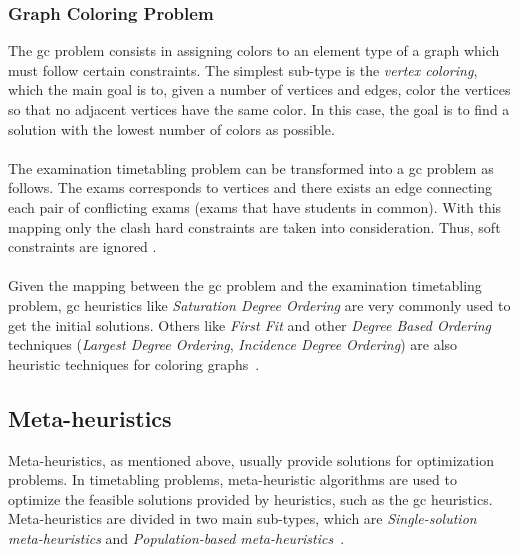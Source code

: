 \subsubsection{Graph Coloring Problem}
The \gls{gc} problem consists in assigning colors to an element type of a graph which must follow certain constraints. The simplest sub-type is the \textit{vertex coloring}, which the main goal is to, given a number of vertices and edges, color the vertices so that no adjacent vertices have the same color. In this case, the goal is to find a solution with the lowest number of colors as possible.\\
\\
The examination timetabling problem can be transformed into a \gls{gc} problem as follows. The exams corresponds to vertices and there exists an edge connecting each pair of conflicting exams (exams that have students in common). With this mapping only the clash hard constraints are taken into consideration. Thus, soft constraints are ignored \cite{Qu2009}.\\
\\
Given the mapping between the \gls{gc} problem and the examination timetabling problem, \gls{gc} heuristics like \textit{Saturation Degree Ordering} are very commonly used to get the initial solutions. Others like \textit{First Fit} and other \textit{Degree Based Ordering} techniques (\textit{Largest Degree Ordering}, \textit{Incidence Degree Ordering}) are also heuristic techniques for coloring graphs~\cite{Carter1996}.


\subsection{Meta-heuristics}
\label{subsec:MetaHeuristics}
Meta-heuristics, as mentioned above, usually provide solutions for optimization problems. In timetabling problems, meta-heuristic algorithms are used to optimize the feasible solutions provided by heuristics, such as the \gls{gc} heuristics. Meta-heuristics are divided in two main sub-types, which are \textit{Single-solution meta-heuristics} and \textit{Population-based meta-heuristics}~\cite{Talbi2009}.

